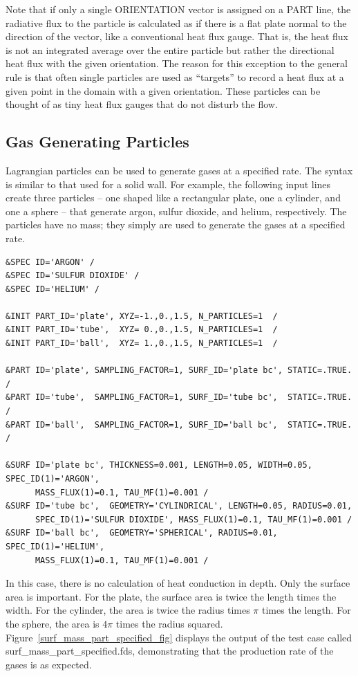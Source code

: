 \documentclass[11pt]{book}
\begin{document}
Note that if only a single {\ct ORIENTATION} vector is assigned on a {\ct PART} line, the radiative flux to the particle is calculated as if there is a flat plate normal to the direction of the vector, like a conventional heat flux gauge. That is, the heat flux is not an integrated average over the entire particle but rather the directional heat flux with the given orientation. The reason for this exception to the general rule is that often single particles are used as ``targets'' to record a heat flux at a given point in the domain with a given orientation. These particles can be thought of as tiny heat flux gauges that do not disturb the flow.

\subsection{Gas Generating Particles}
\label{info:particle_mass_generation}
\label{surf_mass_part_specified}

Lagrangian particles can be used to generate gases at a specified rate. The syntax is similar to that used for a solid wall. For example, the following input lines create three particles -- one shaped like a rectangular plate, one a cylinder, and one a sphere -- that generate argon, sulfur dioxide, and helium, respectively. The particles have no mass; they simply are used to generate the gases at a specified rate.
\begin{lstlisting}
&SPEC ID='ARGON' /
&SPEC ID='SULFUR DIOXIDE' /
&SPEC ID='HELIUM' /

&INIT PART_ID='plate', XYZ=-1.,0.,1.5, N_PARTICLES=1  /
&INIT PART_ID='tube',  XYZ= 0.,0.,1.5, N_PARTICLES=1  /
&INIT PART_ID='ball',  XYZ= 1.,0.,1.5, N_PARTICLES=1  /

&PART ID='plate', SAMPLING_FACTOR=1, SURF_ID='plate bc', STATIC=.TRUE. /
&PART ID='tube',  SAMPLING_FACTOR=1, SURF_ID='tube bc',  STATIC=.TRUE. /
&PART ID='ball',  SAMPLING_FACTOR=1, SURF_ID='ball bc',  STATIC=.TRUE. /

&SURF ID='plate bc', THICKNESS=0.001, LENGTH=0.05, WIDTH=0.05, SPEC_ID(1)='ARGON',
      MASS_FLUX(1)=0.1, TAU_MF(1)=0.001 /
&SURF ID='tube bc',  GEOMETRY='CYLINDRICAL', LENGTH=0.05, RADIUS=0.01,
      SPEC_ID(1)='SULFUR DIOXIDE', MASS_FLUX(1)=0.1, TAU_MF(1)=0.001 /
&SURF ID='ball bc',  GEOMETRY='SPHERICAL', RADIUS=0.01, SPEC_ID(1)='HELIUM',
      MASS_FLUX(1)=0.1, TAU_MF(1)=0.001 /
\end{lstlisting}
In this case, there is no calculation of heat conduction in depth. Only the surface area is important. For the plate, the surface area is twice the length times the width. For the cylinder, the area is twice the radius times $\pi$ times the length. For the sphere, the area is $4\pi$ times the radius squared. Figure~\ref{surf_mass_part_specified_fig} displays the output of the test case called {\ct surf\_mass\_part\_specified.fds}, demonstrating that the production rate of the gases is as expected.
\end{document}
